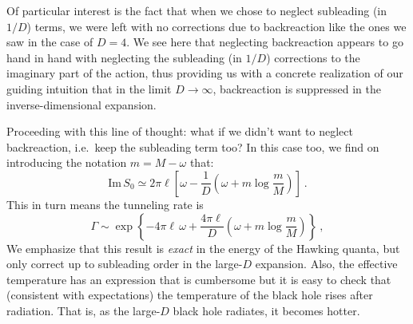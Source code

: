 \documentclass[a4paper,11pt]{article}
\newcommand{\im}{\text{Im} \,}
\begin{document}
Of particular interest is the fact that when we chose to neglect subleading (in $1/D$) terms, we were left with no corrections due to backreaction like the ones we saw in the case of $D = 4$. We see here that neglecting backreaction appears to go hand in hand with neglecting the subleading (in $1/D$) corrections to the imaginary part of the action, thus providing us with a concrete realization of our guiding intuition that in the limit $D \rightarrow \infty$, backreaction is suppressed in the inverse-dimensional expansion. 

Proceeding with this line of thought: what if we didn't want to neglect backreaction, i.e.~keep the subleading term too? In this case too, we find on introducing the notation $m = M - \omega$ that:
\begin{equation}
\label{eq:ImS1D}
\im S_0 \simeq 2\pi\ell \left[ \omega - \frac{1}{D} \left( \omega + m \log \frac{m}{M} \right) \right] \ .
\end{equation}
This in turn means the tunneling rate is
\begin{equation}
\label{eq:GammaSub}
\Gamma \sim \exp \left\lbrace - 4\pi\ell \, \omega + \frac{4\pi\ell}{D} \left( \omega + m \log \frac{m}{M}\right)\right\rbrace \ ,
\end{equation}
We emphasize that this result is \emph{exact} in the energy of the Hawking quanta, but only correct up to subleading order in the large-$D$ expansion. Also, the effective temperature has an expression that is cumbersome but it is easy to check that (consistent with expectations) the temperature of the black hole rises after radiation. That is, as the large-$D$ black hole radiates, it becomes hotter.
\end{document}
